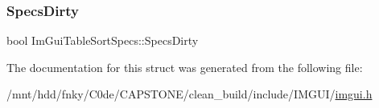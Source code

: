 \mbox{\label{structImGuiTableSortSpecs_a9ecfbcaee92c37003bbb723777358ca3}} 
\subsubsection{\texorpdfstring{Specs\+Dirty}{SpecsDirty}}
{\footnotesize\ttfamily bool Im\+Gui\+Table\+Sort\+Specs\+::\+Specs\+Dirty}



The documentation for this struct was generated from the following file\+:\begin{DoxyCompactItemize}
\item 
/mnt/hdd/fnky/\+C0de/\+C\+A\+P\+S\+T\+O\+N\+E/clean\+\_\+build/include/\+I\+M\+G\+U\+I/\hyperlink{imgui_8h}{imgui.\+h}\end{DoxyCompactItemize}
